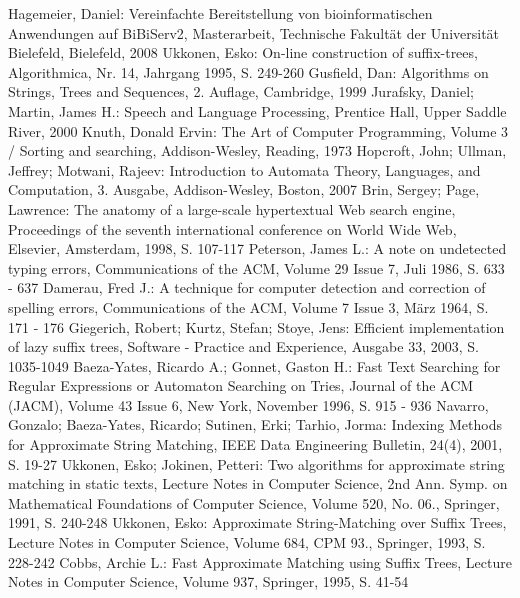 \documentclass{book}
\begin{document}
\begin{thebibliography}{99}
  Hagemeier, Daniel: Vereinfachte Bereitstellung von bioinformatischen Anwendungen auf BiBiServ2, Masterarbeit, Technische Fakultät der Universität Bielefeld, Bielefeld, 2008
  Ukkonen, Esko: On-line construction of suffix-trees, Algorithmica, Nr. 14, Jahrgang 1995, S. 249-260
  Gusfield, Dan: Algorithms on Strings, Trees and Sequences, 2. Auflage, Cambridge, 1999
  Jurafsky, Daniel; Martin, James H.: Speech and Language Processing, Prentice Hall, Upper Saddle River, 2000
  Knuth, Donald Ervin: The Art of Computer Programming, Volume 3 / Sorting and searching, Addison-Wesley, Reading, 1973
  Hopcroft, John; Ullman, Jeffrey; Motwani, Rajeev: Introduction to Automata Theory, Languages, and Computation, 3. Ausgabe, Addison-Wesley, Boston, 2007
  Brin, Sergey; Page, Lawrence: The anatomy of a large-scale hypertextual Web search engine, Proceedings of the seventh international conference on World Wide Web, Elsevier, Amsterdam, 1998, S. 107-117
  Peterson, James L.: A note on undetected typing errors, Communications of the ACM, Volume 29 Issue 7, Juli 1986, S. 633 - 637
  Damerau, Fred J.: A technique for computer detection and correction of spelling errors, Communications of the ACM, Volume 7 Issue 3, März 1964, S. 171 - 176
  Giegerich, Robert; Kurtz, Stefan; Stoye, Jens: Efficient implementation of lazy suffix trees, Software - Practice and Experience, Ausgabe 33, 2003, S. 1035-1049
  Baeza-Yates, Ricardo A.; Gonnet, Gaston H.: Fast Text Searching for Regular Expressions or
 Automaton Searching on Tries, Journal of the ACM (JACM), Volume 43 Issue 6, New York, November 1996, S. 915 - 936 
  Navarro, Gonzalo; Baeza-Yates, Ricardo; Sutinen, Erki; Tarhio, Jorma: Indexing Methods for Approximate String Matching, IEEE Data Engineering Bulletin, 24(4), 2001, S. 19-27
  Ukkonen, Esko; Jokinen, Petteri: Two algorithms for approximate string matching in static texts, Lecture Notes in Computer Science, 2nd Ann. Symp. on Mathematical Foundations of Computer Science, Volume 520, No. 06., Springer, 1991, S. 240-248
  Ukkonen, Esko: Approximate String-Matching over Suffix Trees, Lecture Notes in Computer Science, Volume 684, CPM 93., Springer, 1993, S. 228-242
  Cobbs, Archie L.: Fast Approximate Matching using Suffix Trees, Lecture Notes in Computer Science, Volume 937, Springer, 1995, S. 41-54

\end{thebibliography}
\end{document}
